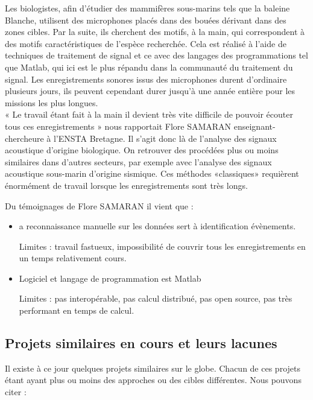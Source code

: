 \documentclass[a4paper]{article}
\begin{document}
Les biologistes, afin d’étudier des mammifères sous-marins tels que la baleine Blanche, utilisent
des microphones placés dans des bouées dérivant dans des zones cibles. Par la suite, ils
cherchent des motifs, à la main, qui correspondent à des motifs caractéristiques de l’espèce
recherchée. Cela est réalisé à l’aide de techniques de traitement de signal et ce avec des langages
des programmations tel que Matlab, qui ici est le plus répandu dans la communauté du
traitement du signal. Les enregistrements sonores issus des microphones durent d’ordinaire
plusieurs jours, ils peuvent cependant durer jusqu’à une année entière pour les missions les
plus longues.
\\

« Le travail étant fait à la main il devient très vite difficile de pouvoir écouter tous
ces enregistrements » nous rapportait Flore SAMARAN enseignant-chercheure à l’ENSTA
Bretagne. Il s’agit donc là de l’analyse des signaux acoustique d’origine biologique. On retrouver
des procédées plus ou moins similaires dans d’autres secteurs, par exemple avec l’analyse des
signaux acoustique sous-marin d’origine sismique. Ces méthodes «classiques» requièrent
énormément de travail lorsque les enregistrements sont très longs.

Du témoignages de Flore SAMARAN il vient que :

\begin{itemize}
	\item a reconnaissance manuelle sur les données sert à identification évènements.

	      Limites : travail fastueux, impossibilité de couvrir tous les enregistrements en un temps
	      relativement cours.

	\item Logiciel et langage de programmation est Matlab

	      Limites : pas interopérable, pas calcul distribué, pas open source, pas très performant en
	      temps de calcul.

\end{itemize}

\subsection{Projets similaires en cours et leurs lacunes}

Il existe à ce jour quelques projets similaires sur le globe. Chacun de ces projets étant ayant plus
ou moins des approches ou des cibles différentes. Nous pouvons citer :
\end{document}
